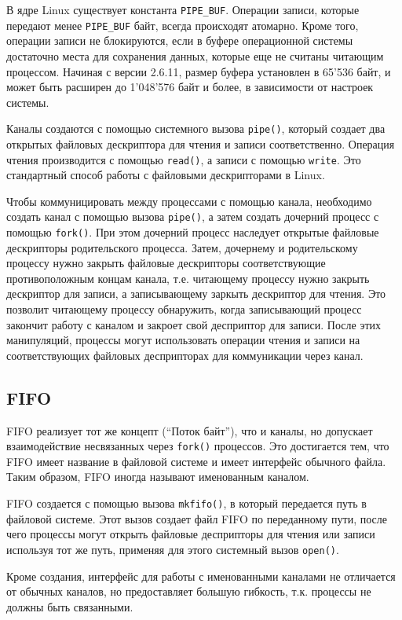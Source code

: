 \documentclass[14pt, russian]{scrartcl}
\begin{document}
В ядре Linux существует константа \verb|PIPE_BUF|. Операции записи, которые
передают менее \verb|PIPE_BUF| байт, всегда происходят атомарно. Кроме того,
операции записи не блокируются, если в буфере операционной системы достаточно
места для сохранения данных, которые еще не считаны читающим процессом. Начиная
с версии 2.6.11, размер буфера установлен в 65'536 байт, и может быть расширен
до 1'048'576 байт и более, в зависимости от настроек системы.

Каналы создаются с помощью системного вызова \verb|pipe()|, который создает два
открытых файловых дескриптора для чтения и записи соответственно. Операция
чтения производится с помощью \verb|read()|, а записи с помощью \verb|write|.
Это стандартный способ работы с файловыми дескрипторами в Linux.

Чтобы коммуницировать между процессами с помощью канала, необходимо создать
канал с помощью вызова \verb|pipe()|, а затем создать дочерний процесс с помощью
\verb|fork()|. При этом дочерний процесс наследует открытые файловые дескрипторы
родительского процесса. Затем, дочернему и родительскому процессу нужно закрыть
файловые дескрипторы соответствующие противоположным концам канала, т.е.
читающему процессу нужно закрыть дескриптор для записи, а записывающему заркыть
дескриптор для чтения. Это позволит читающему процессу обнаружить, когда
записывающий процесс закончит работу с каналом и закроет свой десприптор для
записи. После этих манипуляций, процессы могут использовать операции чтения и
записи на соответствующих файловых десприпторах для коммуникации через канал.

\subsection{FIFO}

FIFO реализует тот же концепт (``Поток байт''), что и каналы, но допускает
взаимодействие несвязанных через \verb|fork()| процессов. Это достигается тем,
что FIFO имеет название в файловой системе и имеет интерфейс обычного файла.
Таким образом, FIFO иногда называют именованным каналом.

FIFO создается с помощью вызова \verb|mkfifo()|, в который передается путь в
файловой системе. Этот вызов создает файл FIFO по переданному пути, после чего
процессы могут открыть файловые десприпторы для чтения или записи используя тот
же путь, применяя для этого системный вызов \verb|open()|.

Кроме создания, интерфейс для работы с именованными каналами не отличается от
обычных каналов, но предоставляет большую гибкость, т.к. процессы не должны быть
связанными.
\end{document}
